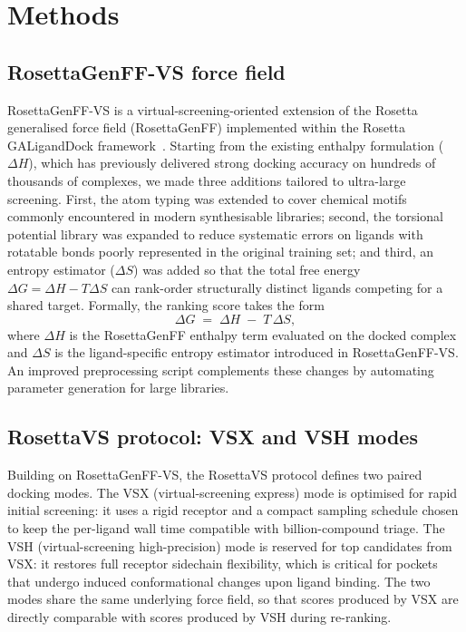 \documentclass[11pt]{article}
\begin{document}
\section{Methods}

\subsection{RosettaGenFF-VS force field}
RosettaGenFF-VS is a virtual-screening-oriented extension of the Rosetta
generalised force field (RosettaGenFF) implemented within the Rosetta
GALigandDock framework~\citep{leman2020rosetta}. Starting from the existing
enthalpy formulation ($\Delta H$), which has previously delivered strong
docking accuracy on hundreds of thousands of complexes, we made three
additions tailored to ultra-large screening. First, the atom typing was
extended to cover chemical motifs commonly encountered in modern
synthesisable libraries; second, the torsional potential library was
expanded to reduce systematic errors on ligands with rotatable bonds
poorly represented in the original training set; and third, an entropy
estimator ($\Delta S$) was added so that the total free energy
$\Delta G = \Delta H - T\Delta S$ can rank-order structurally distinct
ligands competing for a shared target. Formally, the ranking score takes the
form
\begin{equation}
\Delta G \;=\; \Delta H \;-\; T\,\Delta S,
\end{equation}
where $\Delta H$ is the RosettaGenFF enthalpy term evaluated on the
docked complex and $\Delta S$ is the ligand-specific entropy estimator
introduced in RosettaGenFF-VS. An improved preprocessing script
complements these changes by automating parameter generation for large
libraries.

\subsection{RosettaVS protocol: VSX and VSH modes}
Building on RosettaGenFF-VS, the RosettaVS protocol defines two paired
docking modes. The VSX (virtual-screening express) mode is optimised for
rapid initial screening: it uses a rigid receptor and a compact sampling
schedule chosen to keep the per-ligand wall time compatible with
billion-compound triage. The VSH (virtual-screening high-precision) mode
is reserved for top candidates from VSX: it restores full receptor
sidechain flexibility, which is critical for pockets that undergo
induced conformational changes upon ligand binding. The two modes share
the same underlying force field, so that scores produced by VSX are
directly comparable with scores produced by VSH during re-ranking.
\end{document}
